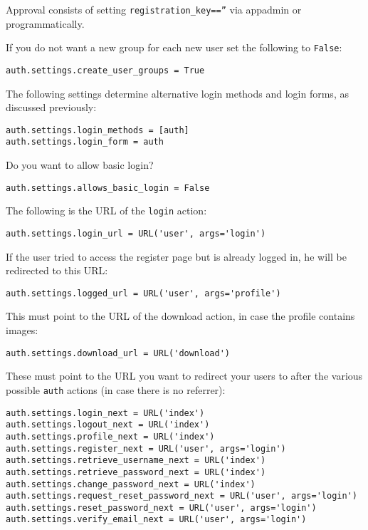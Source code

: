 \documentclass[justified,sixbynine,notoc]{tufte-book}
\def\ft{\small\tt}
\begin{document}
\begin{fullwidth}
Approval consists of setting {\ft registration\_key==''} via appadmin or programmatically.

If you do not want a new group for each new user set the following to {\ft False}:

\begin{lstlisting}
auth.settings.create_user_groups = True
\end{lstlisting}

The following settings determine alternative login methods and login forms, as discussed previously:

\begin{lstlisting}
auth.settings.login_methods = [auth]
auth.settings.login_form = auth
\end{lstlisting}

Do you want to allow basic login?

\begin{lstlisting}
auth.settings.allows_basic_login = False
\end{lstlisting}

The following is the URL of the {\ft login} action:

\begin{lstlisting}
auth.settings.login_url = URL('user', args='login')
\end{lstlisting}

If the user tried to access the register page but is already logged in, he will be redirected to this URL:

\begin{lstlisting}
auth.settings.logged_url = URL('user', args='profile')
\end{lstlisting}

This must point to the URL of the download action, in case the profile contains images:

\begin{lstlisting}
auth.settings.download_url = URL('download')
\end{lstlisting}

These must point to the URL you want to redirect your users to after the various possible {\ft auth} actions (in case there is no referrer):

\begin{lstlisting}
auth.settings.login_next = URL('index')
auth.settings.logout_next = URL('index')
auth.settings.profile_next = URL('index')
auth.settings.register_next = URL('user', args='login')
auth.settings.retrieve_username_next = URL('index')
auth.settings.retrieve_password_next = URL('index')
auth.settings.change_password_next = URL('index')
auth.settings.request_reset_password_next = URL('user', args='login')
auth.settings.reset_password_next = URL('user', args='login')
auth.settings.verify_email_next = URL('user', args='login')
\end{lstlisting}


\end{fullwidth}
\end{document}
